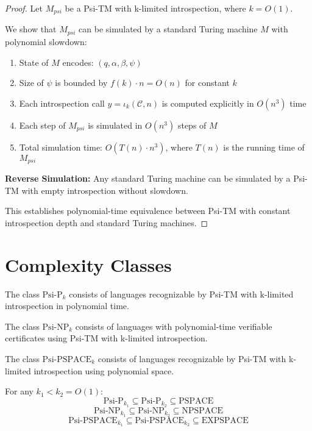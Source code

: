\begin{proof}
Let $M_{psi}$ be a Psi-TM with k-limited introspection, where $k = O(1)$.

We show that $M_{psi}$ can be simulated by a standard Turing machine $M$ with polynomial slowdown:

\begin{enumerate}
\item State of $M$ encodes: $(q, \alpha, \beta, \psi)$
\item Size of $\psi$ is bounded by $f(k) \cdot n = O(n)$ for constant $k$
\item Each introspection call $y=\iota_k(\mathcal{C},n)$ is computed explicitly in $O(n^3)$ time
\item Each step of $M_{psi}$ is simulated in $O(n^3)$ steps of $M$
\item Total simulation time: $O(T(n) \cdot n^3)$, where $T(n)$ is the running time of $M_{psi}$
\end{enumerate}

\textbf{Reverse Simulation:}
Any standard Turing machine can be simulated by a Psi-TM with empty introspection without slowdown.

This establishes polynomial-time equivalence between Psi-TM with constant introspection depth and standard Turing machines.
\end{proof}

\section{Complexity Classes}

\begin{definition}
The class $\text{Psi-P}_k$ consists of languages recognizable by Psi-TM with k-limited introspection in polynomial time.
\end{definition}

\begin{definition}
The class $\text{Psi-NP}_k$ consists of languages with polynomial-time verifiable certificates using Psi-TM with k-limited introspection.
\end{definition}

\begin{definition}
The class $\text{Psi-PSPACE}_k$ consists of languages recognizable by Psi-TM with k-limited introspection using polynomial space.
\end{definition}

\begin{theorem}
For any $k_1 < k_2 = O(1)$:
$$\text{Psi-P}_{k_1} \subseteq \text{Psi-P}_{k_2} \subseteq \text{PSPACE}$$
$$\text{Psi-NP}_{k_1} \subseteq \text{Psi-NP}_{k_2} \subseteq \text{NPSPACE}$$
$$\text{Psi-PSPACE}_{k_1} \subseteq \text{Psi-PSPACE}_{k_2} \subseteq \text{EXPSPACE}$$
\end{theorem}

